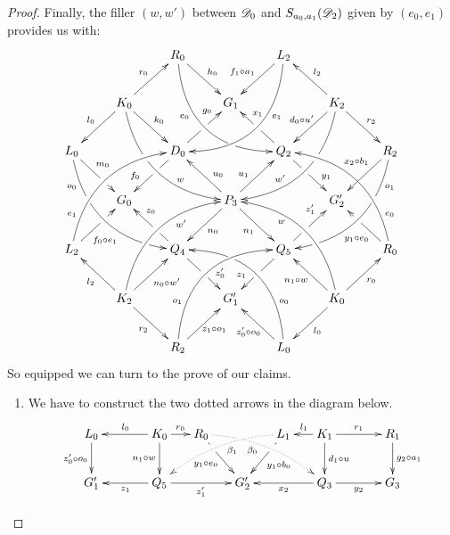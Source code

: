 \begin{proof}
	Finally, the filler $(w,w')$  between $\mathscr{D}_0$ and $S_{a_0,a_1}(\mathscr{D}_2)$ given by $(e_0, e_1)$ provides us with:
\[\xymatrix{&&R_0 \ar@/_1cm/[ddrr]_(.35){e_0}|(.7)\hole \ar[dr]^{h_0}&& L_2\ar@/^1cm/[ddll]^(.35){e_1}  \ar[dl]_{f_1\circ a_1}\\&K_0\ar[dr]^{k_0}\ar[dl]_{l_0} \ar@/_.8cm/[ddrr]|(.36)\hole^(.65){w}\ar[ur]^{r_0}&& G_1 && K_2 \ar@/^.8cm/[ddll]|(.36)\hole_(.65){w'}\ar[dl]_{d_0\circ u'\hspace{-5pt}}\ar[lu]_{l_2} \ar[dr]^{r_2}\\L_0 \ar@/_.8cm/[ddrr]_(.2){o_0}|(.31)\hole|(.81)\hole \ar[dr]^(.4){m_0}|(.61)\hole && D_0 \ar[dl]|(.4)\hole_(.65){f_0}\ar[ur]|(.5)\hole^(.7){g_0}&&Q_2 \ar[dr]|(.4)\hole^(.65){y_1} \ar[ul]|(.5)\hole_(.65){x_1}&&R_2\ar@/^.8cm/[ddll]^(.2){o_1}|(.31)\hole|(.81)\hole\ar[dl]_(.35){x_2\circ b_1}\\&G_0 &&P_3\ar[dr]_{n_1} \ar[dl]^{n_0}\ar[ur]^(.4){u_1}\ar[ul]_(.4){u_0}&&G'_2\\L_2 \ar@/^.8cm/[uurr]^(.2){e_1} \ar[ur]_(.35){f_0\circ e_1}|(.61)\hole&&Q_4 \ar[ul]|(.4)\hole_(.65){z_0}\ar[dr]|(.5)\hole^(.65){z'_0} &&Q_5\ar[ur]|(.4)\hole^(.65){z'_1} \ar[dl]|(.5)\hole_(.65){z_1} && R_0  \ar[ul]^(.35){y_1\circ e_0}|(.61)\hole\ar@/_.8cm/[uull]_(.2){e_0}\\&K_2 \ar[ur]_{n_0\circ w'} \ar[dr]_{r_2} \ar[ul]^{l_2}\ar@/^.8cm/[uurr]_(.65){w'}&&G'_1&& K_0 \ar[ur]_{r_0} \ar[ul]^{n_1\circ w} \ar[dl]^{l_0} \ar@/_.8cm/[uull]^(.65){w}\\&& R_2 \ar[ur]_{\hspace{-4pt}z_1\circ o_1}\ar@/^1cm/[uurr]^(.25){o_1}&& L_0 \ar[ul]^{z'_0\circ o_0\hspace{-5pt}} \ar@/_1cm/[uull]_(.25){o_0} |(.69)\hole }\]	
So equipped we can turn to the prove of our claims.	
	\begin{enumerate}
		\item We have to construct the two dotted arrows in the diagram below.
			\[\xymatrix@C=15pt{L_0 \ar[d]_{z'_0\circ o_0}&& K_0 \ar[d]_{n_1\circ w}\ar[ll]_{l_0} \ar[r]^{r_0} & R_0 \ar@{.>}@/^.35cm/[drrr]_(.4){\beta_0}|(.285)\hole \ar[dr]|(.28)\hole_{y_1\circ e_0} && L_1 \ar@{.>}@/_.35cm/[dlll]^(.4){\beta_1} \ar[dl]|(.28)\hole^{y_1\circ b_0}& K_1 \ar[d]^{d_1\circ u}\ar[l]_{l_1} \ar[rr]^{r_1} && R_1 \ar[d]^{g_2\circ a_1}\\G'_1 && \ar[ll]^{z_1} Q_5 \ar[rr]_{z'_1}&& G'_2  && \ar[ll]^{x_2} Q_3 \ar[rr]_{y_2}&& G_3}\]
			

\end{enumerate}
\end{proof}
